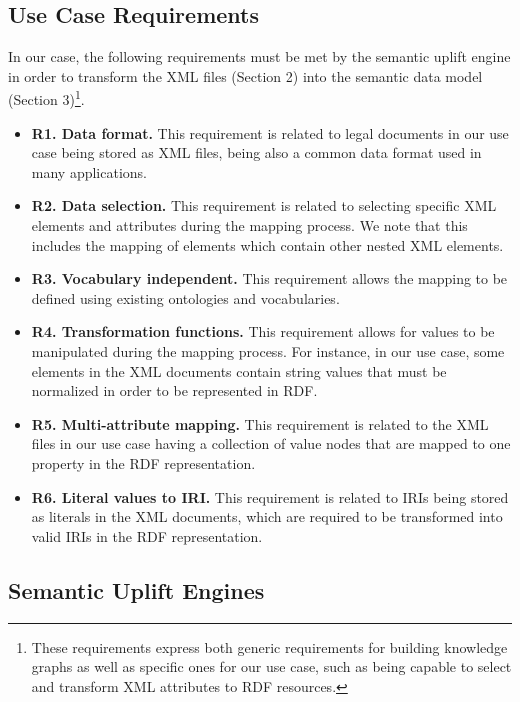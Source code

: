 \documentclass[runningheads]{llncs}
\begin{document}
\subsection{Use Case Requirements}

In our case, the following requirements must be met by the semantic uplift engine in order to transform the XML files (Section 2) into the semantic data model (Section 3)\footnote{These requirements express both generic requirements for building knowledge graphs as well as specific ones for our use case, such as being capable to select and transform XML attributes to RDF resources.}.

\begin{itemize}

\item \textbf{R1. Data format.} This requirement is related to legal documents in our use case being stored as XML files, being also a common data format used in many applications.

\item \textbf{R2. Data selection.} This requirement is related to selecting specific XML elements and attributes during the mapping process. We note that this includes the mapping of elements which contain other nested XML elements.

\item \textbf{R3. Vocabulary independent.} This requirement allows the mapping to be defined using existing ontologies and vocabularies.

\item \textbf{R4. Transformation functions.} This requirement allows for values to be manipulated during the mapping process. For instance, in our use case, some elements in the XML documents contain string values that must be normalized in order to be represented in RDF.

\item \textbf{R5. Multi-attribute mapping.} This requirement is related to the XML files in our use case having a collection of value nodes that are mapped to one property in the RDF representation.

\item \textbf{R6. Literal values to IRI.} This requirement is related to IRIs being stored as literals in the XML documents, which are required to be transformed into valid IRIs in the RDF representation.

\end{itemize}

\subsection{Semantic Uplift Engines}
\end{document}

